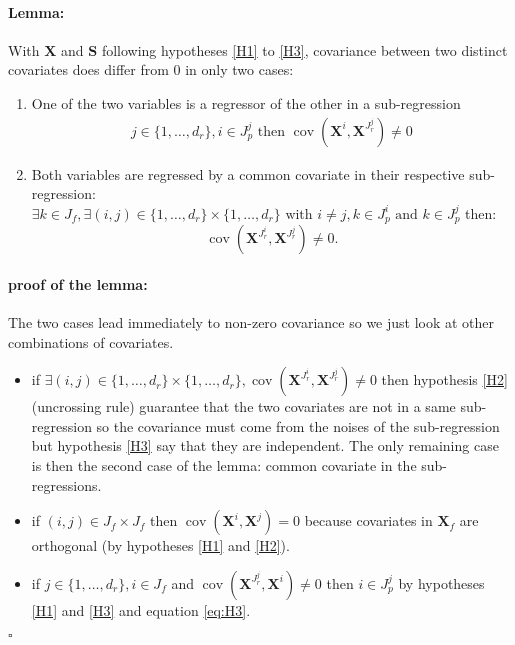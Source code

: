 \documentclass[12pt,a4paper]{report}
\begin{document}
\begin{appendices}
\paragraph{Lemma:} With $\boldsymbol{X}$ and $\boldsymbol{S}$ following hypotheses \ref{H1} to \ref{H3}, covariance between two distinct covariates does differ from $0$ in only two cases:
\begin{enumerate}
	\item One of the two variables is a regressor of the other in a sub-regression	
	\begin{eqnarray}
		j \in \{1,\dots,d_r\}, i \in J_p^j \textrm{ then } \operatorname{cov}(\boldsymbol{X}^{i},\boldsymbol{X}^{J_r^j})\neq 0
	\end{eqnarray}
	\item Both variables are regressed by a common covariate in their respective sub-regression:
$\exists k \in J_f, \exists (i,j)\in \{1,\dots,d_r\}\times \{1,\dots,d_r\} \textrm{ with } i\neq j, k\in J_p^i \textrm{ and } k\in J_p^j$ then:
	\begin{equation}
	\operatorname{cov}(\boldsymbol{X}^{J_r^i},\boldsymbol{X}^{J_r^j})\neq 0. \nonumber 
	\end{equation}
\end{enumerate}

\paragraph{proof of the lemma:}
The two cases lead immediately to non-zero covariance so we just look at other combinations of covariates.
\begin{itemize}
	\item if $\exists (i,j)\in \{1,\dots,d_r\}\times \{1,\dots,d_r\}, \operatorname{cov}(\boldsymbol{X}^{J_r^i},\boldsymbol{X}^{J_r^j})\neq 0$ then hypothesis \ref{H2} (uncrossing rule) guarantee that the two covariates are not in a same sub-regression so the covariance must come from the noises of the sub-regression but hypothesis \ref{H3} say that they are independent. The only remaining case is then the second case of the lemma: common covariate in the sub-regressions.
	\item if $(i,j)\in J_f\times J_f$ then  $\operatorname{cov}(\boldsymbol{X}^i,\boldsymbol{X}^j)=0 $ because covariates in $\boldsymbol{X}_f$ are orthogonal (by hypotheses \ref{H1} and \ref{H2}).
	\item if $j \in \{1,\dots,d_r\}, i \in J_f$ and $\operatorname{cov}(\boldsymbol{X}^{J_r^j},\boldsymbol{X}^i)\neq 0$ then $i\in J_p^j$ by hypotheses \ref{H1} and \ref{H3} and equation \ref{eq:H3}.
\end{itemize}
$\square$


\end{appendices}
\end{document}
